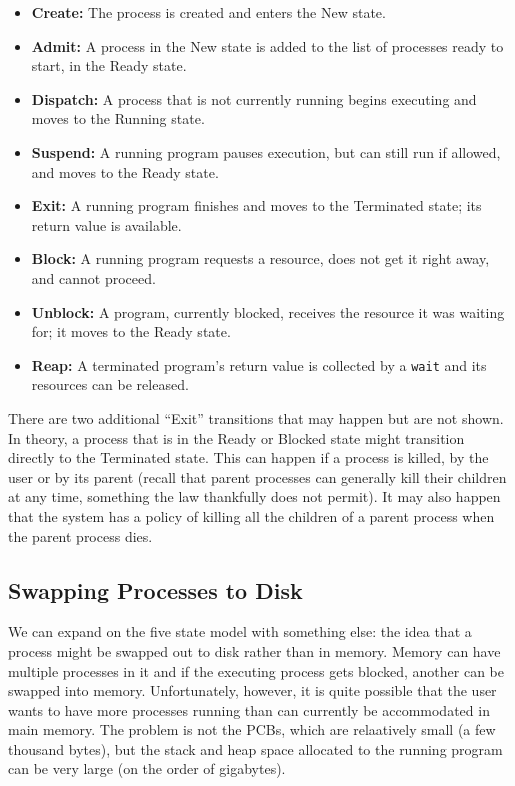 \begin{itemize}
	\item \textbf{Create:} The process is created and enters the New state.
	\item \textbf{Admit:} A process in the New state is added to the list of processes ready to start, in the Ready state.
	\item \textbf{Dispatch:} A process that is not currently running begins executing and moves to the Running state.
	\item \textbf{Suspend:} A running program pauses execution, but can still run if allowed, and moves to the Ready state.
	\item \textbf{Exit:} A running program finishes and moves to the Terminated state; its return value is available.
	\item \textbf{Block:} A running program requests a resource, does not get it right away, and cannot proceed.
	\item \textbf{Unblock:} A program, currently blocked, receives the resource it was waiting for; it moves to the Ready state.
	\item \textbf{Reap:} A terminated program's return value is collected by a \texttt{wait} and its resources can be released.
\end{itemize}

There are two additional ``Exit'' transitions that may happen but are not shown. In theory, a process that is in the Ready or Blocked state might transition directly to the Terminated state. This can happen if a process is killed, by the user or by its parent (recall that parent processes can generally kill their children at any time, something the law thankfully does not permit). It may also happen that the system has a policy of killing all the children of a parent process when the parent process dies.

\subsection*{Swapping Processes to Disk}
We can expand on the five state model with something else: the idea that a process might be swapped out to disk rather than in memory. Memory can have multiple processes in it and if the executing process gets blocked, another can be swapped into memory. Unfortunately, however, it is quite possible that the user wants to have more processes running than can currently be accommodated in main memory. The problem is not the PCBs, which are relaatively small (a few thousand bytes), but the stack and heap space allocated to the running program can be very large (on the order of gigabytes). 

